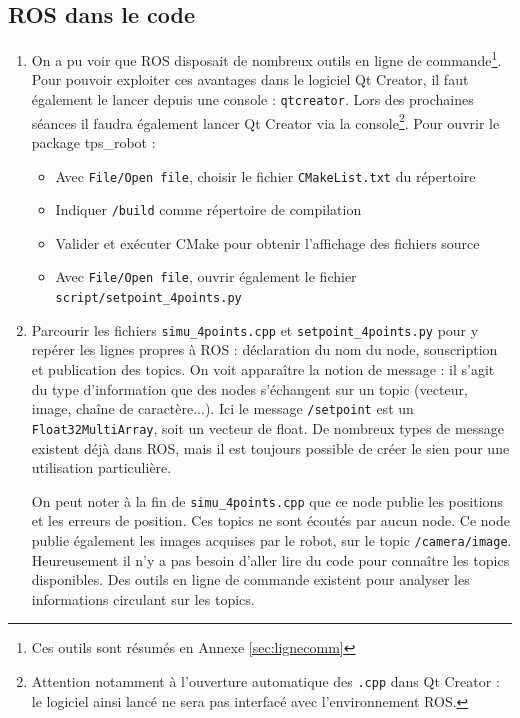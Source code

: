 \documentclass[12pt,a4paper]{article}
\begin{document}
\subsection{ROS dans le code}
\begin{enumerate}
\item On a pu voir que ROS disposait de nombreux outils en ligne de commande\footnote{ Ces outils sont résumés en Annexe \ref{sec:lignecomm}}.
Pour pouvoir exploiter ces avantages dans le logiciel Qt Creator, il faut également le lancer depuis une console : \texttt{qtcreator}.
Lors des prochaines séances il faudra également lancer Qt Creator via la console\footnote{ Attention notamment à l'ouverture automatique des \texttt{.cpp} dans Qt Creator : le logiciel ainsi lancé ne sera pas interfacé avec l'environnement ROS.}.
Pour ouvrir le package tps\_robot :
\begin{itemize}
\item Avec \texttt{File/Open file}, choisir le fichier \texttt{CMakeList.txt} du répertoire \texttt{\ros}
 \item Indiquer \texttt{\ros/build} comme répertoire de compilation
 \item Valider et exécuter CMake pour obtenir l'affichage des fichiers source
 \item Avec \texttt{File/Open file}, ouvrir également le fichier \texttt{script/setpoint\_4points.py}
\end{itemize}
\item Parcourir les fichiers \texttt{simu\_4points.cpp} et \texttt{setpoint\_4points.py} pour y repérer les lignes propres à ROS : déclaration du nom du node, souscription et publication des topics. On voit apparaître la notion de message : il s'agit du type d'information que des nodes s'échangent sur un topic (vecteur, image, chaîne de caractère...). Ici le message \texttt{/setpoint} est un \texttt{Float32MultiArray}, soit un vecteur de float. De nombreux types de message existent déjà dans ROS, mais il est toujours possible de créer le sien pour une utilisation particulière.

On peut noter à la fin de \texttt{simu\_4points.cpp} que ce node publie les positions et les erreurs de position. Ces topics ne sont écoutés par aucun node. 
Ce node publie également les images acquises par le robot, sur le topic \texttt{/camera/image}. 
Heureusement il n'y a pas besoin d'aller lire du code pour connaître les topics disponibles.
Des outils en ligne de commande existent pour analyser les informations circulant sur les topics.

\end{enumerate}
\end{document}
